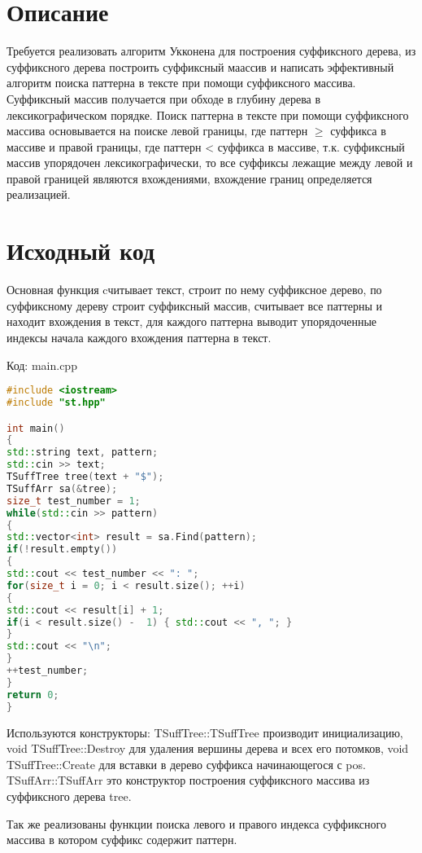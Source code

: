\section{Описание}
Требуется реализовать алгоритм Укконена для построения суффиксного дерева, из
суффиксного дерева построить суффиксный маассив и написать эффективный алгоритм поиска паттерна в тексте при помощи суффиксного массива. 
Суффиксный массив получается при обходе в глубину дерева в лексикографическом порядке. 
Поиск паттерна в тексте при помощи суффиксного массива основывается на поиске
левой границы, где паттерн $\geq$ суффикса в массиве и правой границы, где паттерн
< суффикса в массиве, т.к. суффиксный массив упорядочен лексикографически, то
все суффиксы лежащие между левой и правой границей являются вхождениями,
вхождение границ определяется реализацией.
\pagebreak

\section{Исходный код}
Основная функция cчитывает текст, строит по нему суффиксное дерево, по суффиксному дереву строит суффиксный массив, 
считывает все паттерны и находит вхождения в текст,
для каждого паттерна выводит упорядоченные индексы начала каждого вхождения паттерна в текст.

Код: main.cpp
\begin{lstlisting}[language=C++]
#include <iostream>
#include "st.hpp"

int main()
{
std::string text, pattern;
std::cin >> text;
TSuffTree tree(text + "$");
TSuffArr sa(&tree);
size_t test_number = 1;
while(std::cin >> pattern)
{
std::vector<int> result = sa.Find(pattern);
if(!result.empty())
{
std::cout << test_number << ": ";
for(size_t i = 0; i < result.size(); ++i)
{
std::cout << result[i] + 1;
if(i < result.size() -  1) { std::cout << ", "; }
}
std::cout << "\n";
}
++test_number;
}
return 0;
}
\end{lstlisting}

Используются конструкторы: TSuffTree::TSuffTree производит инициализацию, void TSuffTree::Destroy для  удаления вершины дерева и всех его потомков,
void TSuffTree::Create для вставки в дерево суффикса начинающегося с pos.
TSuffArr::TSuffArr это конструктор построения суффиксного массива из суффиксного дерева tree.

Так же реализованы функции поиска левого и правого индекса суффиксного массива в котором суффикс содержит паттерн.

